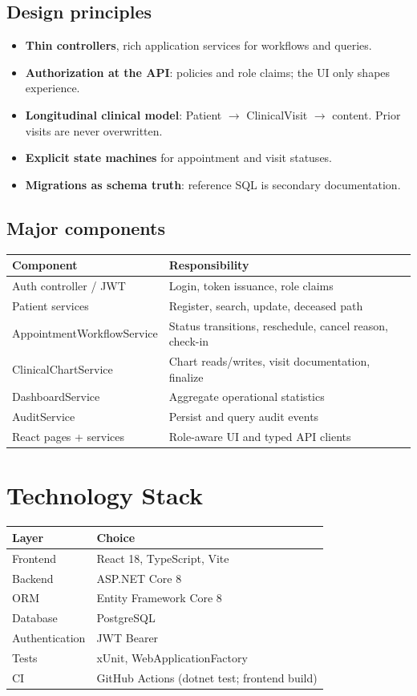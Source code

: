\documentclass[11pt,a4paper]{article}
\begin{document}
\subsection{Design principles}
\begin{itemize}
  \item \textbf{Thin controllers}, rich application services for workflows and queries.
  \item \textbf{Authorization at the API}: policies and role claims; the UI only shapes experience.
  \item \textbf{Longitudinal clinical model}: Patient $\rightarrow$ ClinicalVisit $\rightarrow$ content. Prior visits are never overwritten.
  \item \textbf{Explicit state machines} for appointment and visit statuses.
  \item \textbf{Migrations as schema truth}: reference SQL is secondary documentation.
\end{itemize}

\subsection{Major components}

\begin{tabularx}{\textwidth}{@{}p{3.8cm}X@{}}
\toprule
\textbf{Component} & \textbf{Responsibility} \\
\midrule
Auth controller / JWT & Login, token issuance, role claims \\
Patient services & Register, search, update, deceased path \\
AppointmentWorkflowService & Status transitions, reschedule, cancel reason, check-in \\
ClinicalChartService & Chart reads/writes, visit documentation, finalize \\
DashboardService & Aggregate operational statistics \\
AuditService & Persist and query audit events \\
React pages + services & Role-aware UI and typed API clients \\
\bottomrule
\end{tabularx}

\section{Technology Stack}

\begin{tabularx}{\textwidth}{@{}p{3.5cm}X@{}}
\toprule
\textbf{Layer} & \textbf{Choice} \\
\midrule
Frontend & React 18, TypeScript, Vite \\
Backend & ASP.NET Core 8 \\
ORM & Entity Framework Core 8 \\
Database & PostgreSQL \\
Authentication & JWT Bearer \\
Tests & xUnit, WebApplicationFactory \\
CI & GitHub Actions (dotnet test; frontend build) \\
\bottomrule
\end{tabularx}
\end{document}
